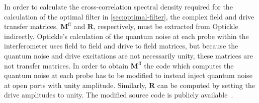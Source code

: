 In order to calculate the cross-correlation spectral density required for the calculation of the optimal filter in \cref{sec:optimal-filter}, the complex field and drive transfer matrices, $\mathbf{M}^{\textrm{ff}}$ and $\mathbf{R}$, respectively, must be extracted from Optickle indirectly. Optickle's calculation of the quantum noise at each probe within the interferometer uses field to field and drive to field matrices, but because the quantum noise and drive excitations are not necessarily unity, these matrices are not transfer matrices. In order to obtain $\mathbf{M}^{\textrm{ff}}$ the code which computes the quantum noise at each probe has to be modified to instead inject quantum noise at open ports with unity amplitude. Similarly, $\mathbf{R}$ can be computed by setting the drive amplitudes to unity. The modified source code is publicly available~\cite{controlspaperdata}.